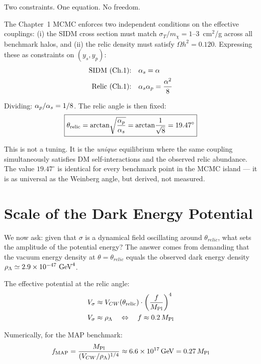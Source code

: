 Two constraints. One equation. No freedom.

The Chapter~1 MCMC enforces two independent conditions on the effective couplings:
(i) the SIDM cross section must match $\sigma_T/m_\chi = 1$--$3$~cm$^2$/g
across all benchmark halos, and (ii) the relic density must satisfy $\Omega h^2 = 0.120$.
Expressing these as constraints on $(y_s, y_p)$:
\begin{align}
  \text{SIDM (Ch.1):} \quad & \alpha_s = \alpha \\
  \text{Relic (Ch.1):} \quad & \alpha_s\alpha_p = \frac{\alpha^2}{8}
\end{align}

Dividing: $\alpha_p/\alpha_s = 1/8$. The relic angle is then fixed:
\begin{equation}
  \boxed{\theta_{\rm relic} = \arctan\!\sqrt{\frac{\alpha_p}{\alpha_s}}
         = \arctan\!\frac{1}{\sqrt{8}} = 19.47^\circ}
\end{equation}

This is not a tuning. It is the \emph{unique} equilibrium where the same
coupling simultaneously satisfies DM self-interactions and the observed relic
abundance. The value $19.47^\circ$ is identical for every benchmark point in
the MCMC island — it is as universal as the Weinberg angle, but derived, not measured.

\section{Scale of the Dark Energy Potential}
\label{ch3:scale}

We now ask: given that $\sigma$ is a dynamical field oscillating around
$\theta_{relic}$, what sets the amplitude of the potential energy?
The answer comes from demanding that the vacuum energy density at
$\theta = \theta_{relic}$ equals the observed dark energy density
$\rho_\Lambda \simeq 2.9 \times 10^{-47}~{\rm GeV}^4$.

The effective potential at the relic angle:
\begin{align}
  V_\sigma &\approx V_{CW}(\theta_{\rm relic}) \cdot \left(\frac{f}{M_{\rm Pl}}\right)^4 \\
  V_\sigma &\approx \rho_\Lambda \quad\Leftrightarrow\quad f \approx 0.2\,M_{\rm Pl}
\end{align}

Numerically, for the MAP benchmark:
\begin{equation}
  f_{\rm MAP} = \frac{M_{\rm Pl}}{(V_{CW}/\rho_\Lambda)^{1/4}}
              \approx 6.6\times10^{17}\,{\rm GeV} = 0.27\,M_{\rm Pl}
\end{equation}

